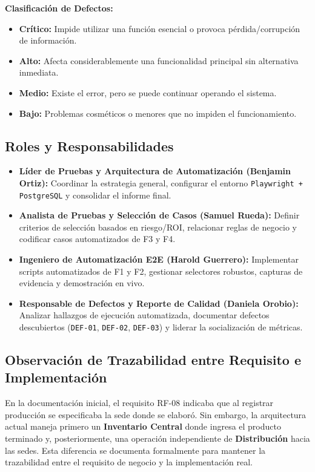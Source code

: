 \documentclass[11pt,a4paper]{article}
\begin{document}
\textbf{Clasificación de Defectos:}
\begin{itemize}
    \item \textbf{Crítico:} Impide utilizar una función esencial o provoca pérdida/corrupción de información.
    \item \textbf{Alto:} Afecta considerablemente una funcionalidad principal sin alternativa inmediata.
    \item \textbf{Medio:} Existe el error, pero se puede continuar operando el sistema.
    \item \textbf{Bajo:} Problemas cosméticos o menores que no impiden el funcionamiento.
\end{itemize}

\subsection{Roles y Responsabilidades}
\begin{itemize}
    \item \textbf{Líder de Pruebas y Arquitectura de Automatización (Benjamin Ortiz):} Coordinar la estrategia general, configurar el entorno \texttt{Playwright + PostgreSQL} y consolidar el informe final.
    \item \textbf{Analista de Pruebas y Selección de Casos (Samuel Rueda):} Definir criterios de selección basados en riesgo/ROI, relacionar reglas de negocio y codificar casos automatizados de F3 y F4.
    \item \textbf{Ingeniero de Automatización E2E (Harold Guerrero):} Implementar scripts automatizados de F1 y F2, gestionar selectores robustos, capturas de evidencia y demostración en vivo.
    \item \textbf{Responsable de Defectos y Reporte de Calidad (Daniela Orobio):} Analizar hallazgos de ejecución automatizada, documentar defectos descubiertos (\texttt{DEF-01}, \texttt{DEF-02}, \texttt{DEF-03}) y liderar la socialización de métricas.
\end{itemize}

\subsection{Observación de Trazabilidad entre Requisito e Implementación}
En la documentación inicial, el requisito RF-08 indicaba que al registrar producción se especificaba la sede donde se elaboró. Sin embargo, la arquitectura actual maneja primero un \textbf{Inventario Central} donde ingresa el producto terminado y, posteriormente, una operación independiente de \textbf{Distribución} hacia las sedes. Esta diferencia se documenta formalmente para mantener la trazabilidad entre el requisito de negocio y la implementación real.
\end{document}
